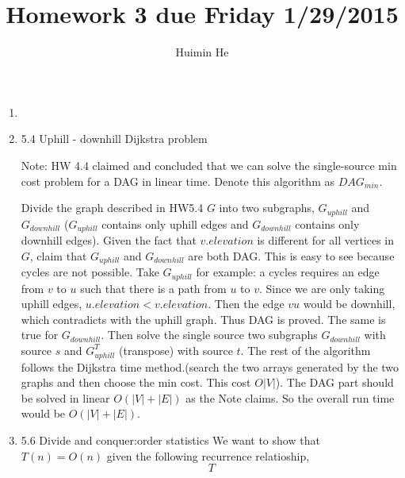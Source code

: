 \documentclass[a4paper]{article}
\title{Homework 3 due Friday 1/29/2015}
\author{Huimin He}
\begin{document}
\maketitle

\begin{enumerate}
\item  

\item 5.4 Uphill - downhill Dijkstra problem

Note: HW 4.4 claimed and concluded that we can solve the single-source min cost problem for a DAG in linear time. Denote this algorithm as $DAG_{min}$. 

Divide the graph described in HW5.4 $G$ into two subgraphs, $G_{uphill}$ and $G_{downhill}$ ($G_{uphill}$ contains only uphill edges and $G_{downhill}$ contains only downhill edges). Given the fact that $v.elevation$ is different for all vertices in $G$, claim that $G_{uphill}$ and $G_{downhill}$ are both DAG. This is easy to see because cycles are not possible. Take $G_{uphill}$ for example: a cycles requires an edge from $v$ to $u$ such that there is a path from $u$ to $v$. Since we are only taking uphill edges, $u.elevation < v.elevation$. Then the edge $vu$ would be downhill, which contradicts with the uphill graph. Thus DAG is proved. The same is true for $G_{downhill}$. Then solve the single source two subgraphs $G_{downhill}$ with source $s$ and $G^T_{uphill}$ (transpose) with source $t$. The rest of the algorithm follows the Dijkstra time method.(search the two arrays generated by the two graphs and then choose the min cost. This cost $O|V|$). The DAG part should be solved in linear $O(|V|+|E|)$ as the Note claims. So the overall run time would be $O(|V|+|E|)$.

\item 5.6 Divide and conquer:order statistics
We want to show that $T(n) = O(n)$ given the following recurrence relatioship,
\[
T
\]

\end{enumerate}
\end{document}
